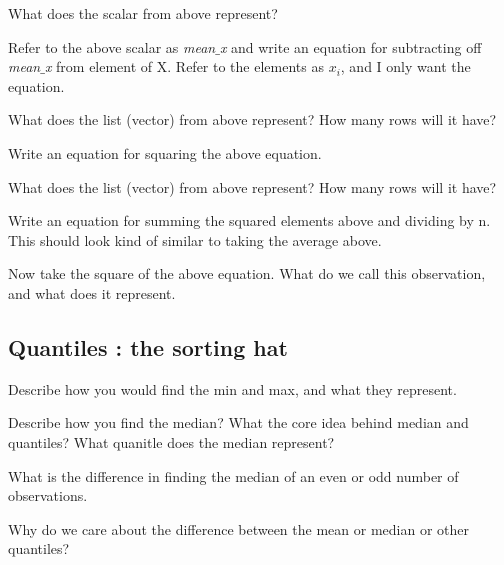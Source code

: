 \documentclass[11pt]{article}
\begin{document}
 What does the scalar from above represent? 
\newline 
\newline
\newline 


Refer to the above scalar as \emph{mean$\_$x} and write an equation for subtracting off \emph{mean$\_$x} from element of X. Refer to the elements as $x_i$, and I only want the equation. 
\newline 
\newline
\newline 


What does the list (vector) from above represent? How many rows will it have?
\newline 
\newline
\newline 

Write an equation for squaring the above equation.
\newline 
\newline
\newline 


What does the list (vector) from above represent? How many rows will it have?
\newline 
\newline
\newline 


Write an equation for summing the squared elements above and dividing by n. This should look kind of similar to taking the average above.
\newline 
\newline
\newline 


Now take the square of the above equation. What do we call this observation, and what does it represent.
\newline 
\newline
\newline 



\subsection{  Quantiles : the sorting hat}

Describe how you would find the min and max, and what they represent. 
\newline 
\newline
\newline 

Describe how you find the median? What the core idea behind median and quantiles? What quanitle does the median represent? 
\newline 
\newline
\newline 

What is the difference in finding the median of an even or odd number of observations.
\newline 
\newline
\newline 


Why do we care about the difference between the mean or median or other quantiles? 
\newline 
\newline
\newline 
\end{document}
